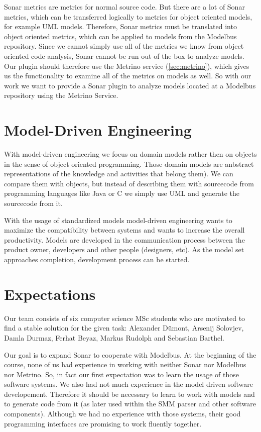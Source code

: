 Sonar metrics are metrics for normal source code. But there are a lot of Sonar metrics, which can be transferred logically to metrics for object oriented models, for example UML models. Therefore, Sonar metrics must be translated into object oriented metrics, which can be applied to models from the Modelbus repository. Since we cannot simply use all of the metrics we know from object oriented code analysis, Sonar cannot be run out of the box to analyze models. Our plugin should therefore use the Metrino service (\autoref{sec:metrino}), which gives us the functionality to examine all of the metrics on models as well. So with our work we want to provide a Sonar plugin to analyze models located at a Modelbus repository using the Metrino Service.

\section{Model-Driven Engineering} \label{sec:model_driven_engineering}
With model-driven engineering we focus on domain models rather then on objects in the sense of object oriented programming. Those domain models are anbstract representations of the knowledge and activities that belong them). We can compare them with objects, but instead of describing them with sourcecode from programming languages like Java or C we simply use UML and generate the sourcecode from it.

With the usage of standardized models model-driven engineering wants to maximize the compatibility between systems and wants to increase the overall productivity. Models are developed in the communication process between the product owner, developers and other people (designers, etc). As the model set approaches completion, development process can be started.

\section{Expectations}
Our team consists of six computer science MSc students who are motivated to find a stable solution for the given task: Alexander Dümont, Arsenij Solovjev, Damla Durmaz, Ferhat Beyaz, Markus Rudolph and Sebastian Barthel.

Our goal is to expand Sonar to cooperate with Modelbus. At the beginning of the course, none of us had experience in working with neither Sonar nor Modelbus nor Metrino. So, in fact our first expectation was to learn the usage of those software systems. We also had not much experience in the model driven software developement. Therefore it should be necessary to learn to work with models and to generate code from it (as later used within the SMM parser and other software components). Although we had no experience with those systems, their good programming interfaces are promising to work fluently together.

